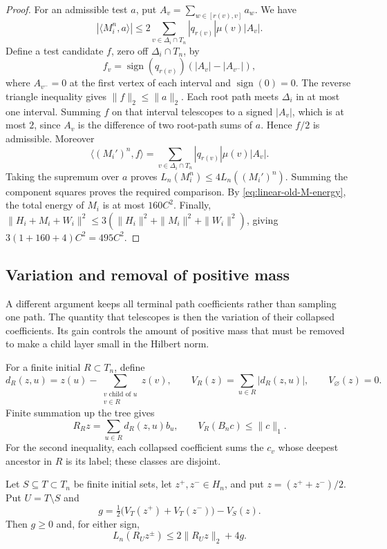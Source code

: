 \begin{proof}
For an admissible test \(a\), put
\(A_v=\sum_{w\in[r(v),v]}a_w\).  We have
\[
 |\langle M_i^n,a\rangle|
 \le2\sum_{v\in \Delta_i\cap T_n}|q_{r(v)}|\mu(v)|A_v|.
\]
Define a test candidate \(f\), zero off \(\Delta_i\cap T_n\), by
\[
 f_v=\operatorname{sign}(q_{r(v)})(|A_v|-|A_{v^-}|),
\]
where \(A_{v^-}=0\) at the first vertex of each interval and
\(\operatorname{sign}(0)=0\).  The reverse triangle inequality gives
\(\|f\|_2\le\|a\|_2\).  Each root path meets \(\Delta_i\) in at most one
interval.  Summing \(f\) on that interval telescopes to a signed
\(|A_v|\), which is at most \(2\), since \(A_v\) is the difference of
two root-path sums of \(a\).  Hence \(f/2\) is admissible.  Moreover
\[
 \langle(M_i')^n,f\rangle
 =\sum_{v\in \Delta_i\cap T_n}|q_{r(v)}|\mu(v)|A_v|.
\]
Taking the supremum over \(a\) proves
\(L_n(M_i^n)\le4L_n((M_i')^n)\).  Summing the component squares proves
the required comparison.  By \eqref{eq:linear-old-M-energy}, the total
energy of \(M_i\) is at most \(160C^2\).  Finally,
\(\|H_i+M_i+W_i\|^2\le3(\|H_i\|^2+\|M_i\|^2+\|W_i\|^2)\), giving
\(3(1+160+4)C^2=495C^2\).
\end{proof}

\subsection{Variation and removal of positive mass}

A different argument keeps all terminal path coefficients rather than
sampling one path.  The quantity that telescopes is then the variation
of their collapsed coefficients.  Its gain controls the amount of
positive mass that must be removed to make a child layer small in the
Hilbert norm.

For a finite initial \(R\subset T_n\), define
\[
 d_R(z,u)=z(u)-\sum_{\substack{v\text{ child of }u\\v\in R}}z(v),
 \qquad V_R(z)=\sum_{u\in R}|d_R(z,u)|,
 \qquad V_\varnothing(z)=0.
\]
Finite summation up the tree gives
\begin{equation}\label{eq:linear-variation-representation}
 R_Rz=\sum_{u\in R}d_R(z,u)b_u,
 \qquad V_R(B_nc)\le\|c\|_1.
\end{equation}
For the second inequality, each collapsed coefficient sums the \(c_v\)
whose deepest ancestor in \(R\) is its label; these classes are disjoint.

\begin{lemma}\label{lem:linear-mass-removal}
Let \(S\subseteq T\subset T_n\) be finite initial sets, let
\(z^+,z^-\in H_n\), and put \(z=(z^++z^-)/2\).  Put \(U=T\setminus S\) and
\[
 g=\tfrac12\big(V_T(z^+)+V_T(z^-)\big)-V_S(z).
\]
Then \(g\ge0\) and, for either sign,
\begin{equation}\label{eq:linear-mass-removal}
 L_n(R_Uz^\pm)\le2\|R_Uz\|_2+4g.
\end{equation}
\end{lemma}

